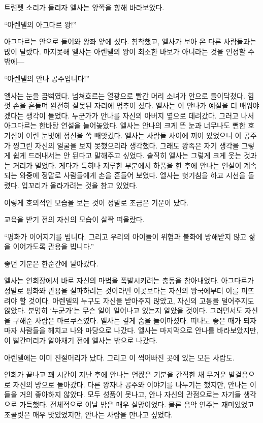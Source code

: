 트럼펫 소리가 들리자 엘사는 앞쪽을 향해 바라보았다.

``아렌델의 아그다르 왕!''

아그다르는 안으로 들어와 왕좌 앞에 섰다. 침착했고, 엘사가 보아 온 다른 사람들과는 많이 달랐다. 마지못해 엘사는 아렌델의 왕이 최소한 바보가 아니라는 것을 인정할 수밖에—

``아렌델의 안나 공주입니다!''

엘사는 눈을 끔뻑였다. 넘쳐흐르는 열광으로 빨간 머리 소녀가 안으로 들이닥쳤다. 힘껏 손을 흔들며 완전히 잘못된 자리에 멈추어 섰다. 엘사는 이 안나가 예절을 더 배워야겠다는 생각이 들었다. 누군가가 안나를 자신의 아버지 옆으로 데려갔다. 그러고 나서 아그다르는 한바탕 연설을 늘어놓았다. 엘사는 안나의 크게 뜬 눈과 너무나도 뻔한 호기심이 어린 눈빛에 정신을 쏙 빼앗겼다. 엘사는 사람들 사이에 끼어 있었으니 이 공주가 찡그린 자신의 얼굴을 보지 못했으리라 생각했다. 그래도 왕족은 자기 생각을 그렇게 쉽게 드러내서는 안 된다고 말해주고 싶었다. 솔직히 엘사는 그렇게 크게 웃는 것과는 거리가 멀었다. 게다가 특히나 지루한 부분에서 하품을 한 후에 안나는 연설이 계속되는 와중에 정말로 사람들에게 손을 흔들어 보였다. 엘사는 헛기침을 하고 시선을 돌렸다. 입꼬리가 올라가려는 것을 참고 있었다.

이렇게 호의적인 모습을 보는 것이 정말로 조금은 기운이 났다.

교육을 받기 전의 자신의 모습이 살짝 떠올랐다.

`` 평화가 이어지기를 빕니다. 그리고 우리의 아이들이 위협과 불화에 방해받지 않고 삶을 이어가도록 관용을 빕니다.''

좋던 기분은 한순간에 날아갔다.

엘사는 연회장에서 바로 자신의 마법을 폭발시키려는 충동을 참아내었다. 아그다르가 정말로 평화와 관용을 설파하려는 것이라면 이곳보다는 자신의 왕국에부터 이를 퍼뜨려야 할 것이다. 아렌델의 누구도 자신을 받아주지 않았고, 자신의 고통을 덜어주지도 않았다. 분명히 `누군가'는 무슨 일이 일어나고 있는지 알았을 것이다. 그러면서도 자신을 구해준 사람은 마르쿠스였다. 엘사는 깊게 숨을 들이마셨다. 떠나도 좋은 때가 되자마자 사람들을 헤치고 나와 마당으로 나갔다. 엘사는 마지막으로 안나를 바라보았지만, 이 빨간머리가 알아채기 전에 엘사는 밖으로 나갔다.

아렌델에는 이미 진절머리가 났다. 그리고 이 썩어빠진 곳에 있는 모든 사람도.

\textbreak

연회가 끝나고 꽤 시간이 지난 후에 안나는 언짢은 기분을 간직한 채 무거운 발걸음으로 자신의 방으로 돌아갔다. 다른 왕자나 공주와 이야기를 나누기는 했지만, 안나는 이들을 거의 좋아하지 않았다. 모두 성품이 못나고, 안나 자신의 관점으로는 자기들 생각으로 가득했다. 전체적으로 이날 밤은 매우 실망이었다. 물론 음악 연주는 재미있었고 초콜릿은 매우 맛있었지만, 안나는 사람을 만나고 싶었다. 

